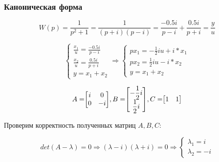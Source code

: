 \documentclass[14pt,a4paper,report]{report}
\begin{document}
\subsubsection{Каноническая форма}

\begin{equation*}
\text{$W(p)=\frac{1}{p^2 + 1}=\frac{1}{(p + i)(p - i)}=\frac{-0.5i}{p - i} + \frac{0.5i}{p + i} = \frac{y}{u}$}
\end{equation*}

\begin{equation*}
\begin{cases}
	\text{$\frac{x_1}{u}=\frac{-0.5i}{p - i}$} \\
	\text{$\frac{x_2}{u}=\frac{0.5i}{p + i}$} \\
	\text{$y = x_1 + x_2$}
\end{cases}
\Longrightarrow
\begin{cases}
\text{$px_1= - \frac{1}{2} i u + i*x_1$} \\
\text{$px_2= \frac{1}{2} i u - i*x_2$} \\
\text{$y=x_1+x_2$}
\end{cases}
\end{equation*}

\begin{equation*}
\text{$A=$}
\text{$
	\begin{bmatrix}
	i & 0 \\
	0 & -i \\
	\end{bmatrix}
	$}
\text{$, B=$}
\text{$
	\begin{bmatrix}
	-\frac{1}{2}i \\
	 \frac{1}{2}i \\
	\end{bmatrix}
	$}
\text{$, C=$}
\text{$
	\begin{bmatrix}
	1 & 1 \\
	\end{bmatrix}
	$}
\end{equation*}

Проверим корректность полученных матриц $A, B, C$:

\begin{equation*}
\text{$det(A-\lambda)=0$}
\Longrightarrow
	\text{$(\lambda - i)(\lambda + i)=0$}
\Longrightarrow
\begin{cases}
	\text{$\lambda_1=i$} \\
	\text{$\lambda_2=-i$}
\end{cases}
\end{equation*}
\end{document}
